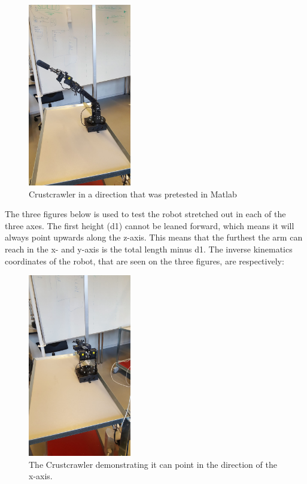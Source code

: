 \begin{figure}[H]
    \centering
    \includegraphics[width=0.4\textwidth,trim={0 20cm 0 18cm},clip]{figures/Matlab.jpg}
    \caption{Crustcrawler in a direction that was pretested in Matlab}
    \label{fig:matlab}
\end{figure}

The three figures below is used to test the robot stretched out in each of the three axes. The first height (d1) cannot be leaned forward, which means it will always point upwards along the z-axis. This means that the furthest the arm can reach in the x- and y-axis is the total length minus d1. The inverse kinematics coordinates of the robot, that are seen on the three figures, are respectively: \newline
[37, 0, 13] \newline
[0, 37, 13] \newline
[0, 0, 50]

\begin{figure}[H]
    \centering
    \includegraphics[width=0.4\textwidth,trim={0 25cm 0 18cm},clip]{figures/x.jpg}
    \caption{The Crustcrawler demonstrating it can point in the direction of the x-axis.}
    \label{fig:my_label}
\end{figure}

